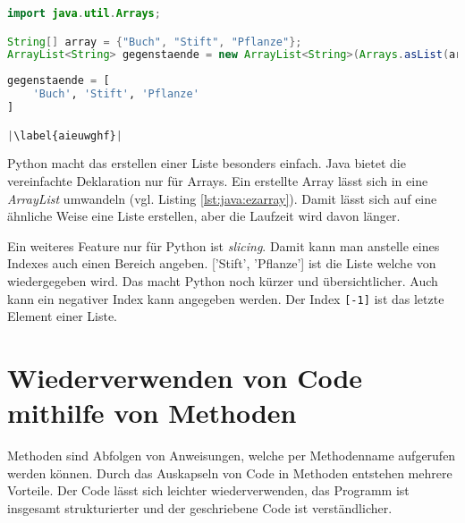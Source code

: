\begin{minipage}{.5\linewidth}
\begin{lstlisting}[language=java,caption={Einfache Deklarierung Java},captionpos=b,label={lst:java:ezarray},frame=none]
import java.util.Arrays;

String[] array = {"Buch", "Stift", "Pflanze"};
ArrayList<String> gegenstaende = new ArrayList<String>(Arrays.asList(array));
\end{lstlisting}
\end{minipage}
\begin{minipage}{.5\linewidth}
\begin{lstlisting}[language=python,caption={Einfach Deklarierung Python},captionpos=b,label={lst:python:ezarray},frame=l,escapechar=|]
gegenstaende = [
    'Buch', 'Stift', 'Pflanze'
]

|\label{aieuwghf}|
\end{lstlisting}
\end{minipage}

Python macht das erstellen einer Liste besonders einfach. Java bietet die vereinfachte Deklaration nur für Arrays. Ein erstellte Array lässt sich in eine \textit{ArrayList} umwandeln (vgl. Listing \ref{lst:java:ezarray}). Damit lässt sich auf eine ähnliche Weise eine Liste erstellen, aber die Laufzeit wird davon länger.

Ein weiteres Feature nur für Python ist \textit{slicing}. Damit kann man anstelle eines Indexes auch einen Bereich angeben. ['Stift', 'Pflanze'] ist die Liste welche von  wiedergegeben wird. Das macht Python noch kürzer und übersichtlicher. Auch kann ein negativer Index kann angegeben werden. Der Index \texttt{[-1]} ist das letzte Element einer Liste.\par

\section{Wiederverwenden von Code mithilfe von Methoden}
Methoden sind Abfolgen von Anweisungen, welche per Methodenname aufgerufen werden können. Durch das Auskapseln von Code in Methoden entstehen mehrere Vorteile. Der Code lässt sich leichter wiederverwenden, das Programm ist insgesamt strukturierter und der geschriebene Code ist verständlicher. \cite{Louis:2010}\cite{Python3:Buch}

